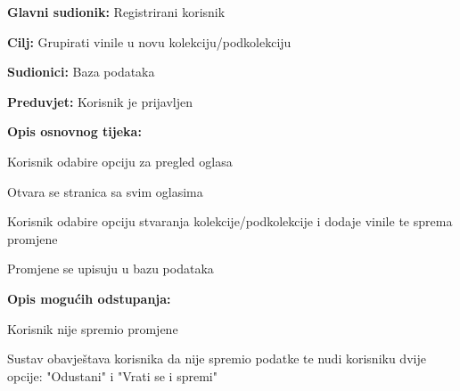 				\noindent {}
					\begin{packed_item}
	
						\item \textbf{Glavni sudionik: }Registrirani korisnik
						\item  \textbf{Cilj:} Grupirati vinile u novu kolekciju/podkolekciju
						\item  \textbf{Sudionici:} Baza podataka
						\item  \textbf{Preduvjet:} Korisnik je prijavljen
						\item  \textbf{Opis osnovnog tijeka:}
						
						\item[] \begin{packed_enum}
	
							\item Korisnik odabire opciju za pregled oglasa
							\item Otvara se stranica sa svim oglasima
							\item Korisnik odabire opciju stvaranja kolekcije/podkolekcije i dodaje vinile te sprema promjene
							\item Promjene se upisuju u bazu podataka

						\end{packed_enum}
						
						\item  \textbf{Opis mogućih odstupanja:}
						
						\item[] \begin{packed_item}
	
							\item[3.a] Korisnik nije spremio promjene
								\begin{packed_item}
									\item Sustav obavještava korisnika da nije spremio podatke te nudi korisniku dvije opcije: "Odustani" i "Vrati se i spremi"
								\end{packed_item}
								
						\end{packed_item}							
					\end{packed_item}
					
